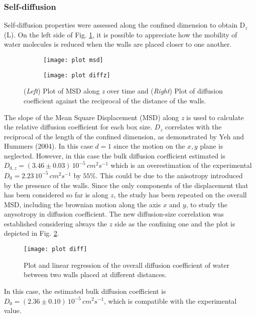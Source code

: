 \documentclass[
	12pt, %
]{fphw}
\begin{document}
\subsubsection{Self-diffusion}
Self-diffusion properties were assessed along the confined dimension to obtain D$_{z}$(L).
On the left side of Fig. \ref{diffz}, it is possible to appreciate how the mobility of water molecules is reduced when the walls are placed closer to one another.
\begin{figure}[h!]
	\centering
	\begin{subfigure}{0.45\textwidth}
		\texttt{[image: plot msd]}
	\end{subfigure}
	\begin{subfigure}{0.45\textwidth}
		\texttt{[image: plot diffz]}
	\end{subfigure}	
	\caption{(\textit{Left}) Plot of MSD along \textit{z} over time and (\textit{Right}) Plot of diffusion coefficient against the reciprocal of the distance of the walls.}
	\label{diffz}
\end{figure}
The slope of the Mean Square Displacement (MSD) along \textit{z} is used to calculate the relative diffusion coefficient for each box size.
$D_{z}$ correlates with the reciprocal of the length of the confined dimension, as demonstrated by Yeh and Hummers (2004).
In this case $d = 1$ since the motion on the $x,y$ plane is neglected.
However, in this case the bulk diffusion coefficient estimated is  $D_{0,z} = (3.46 \pm 0.03)\, 10^{-5} \, cm^{2} s^{-1}$ which is an overestimation of the experimental $D_{0} = 2.23 \, 10^{-5}\, cm^{2} s^{-1}$ by $55\%$.
This could be due to the anisotropy introduced by the presence of the walls.
Since the only components of the displacement that has been considered so far is along $z$, the study has been repeated on the overall MSD, including the brownian motion along the axis $x$ and $y$, to study the anysotropy in diffusion coefficient.
The new diffusion-size correlation was established considering always the $z$ side as the confining one and the plot is depicted in Fig. \ref{diff}.
\begin{figure}
	\centering
	\texttt{[image: plot diff]}
	\caption{Plot and linear regression of the overall diffusion coefficient of water between two walls placed at different distances.}
	\label{diff}
\end{figure}
In this case, the estimated bulk diffusion coefficient is $D_{0} = (2.36 \pm 0.10)\, 10^{-5} \, cm^{2} s^{-1}$, which is compatible with the experimental value.
\end{document}
